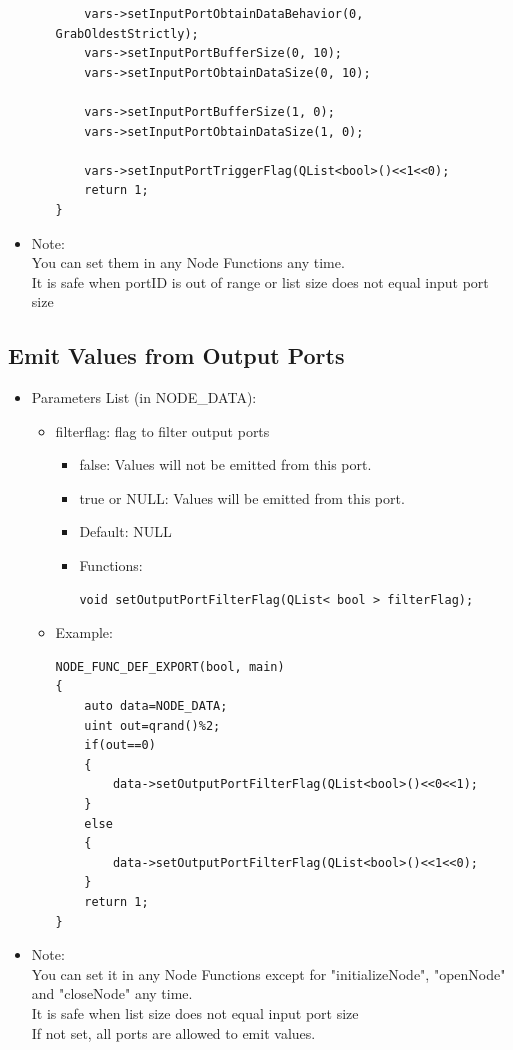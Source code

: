 \documentclass[a4paper,10pt]{book}
\begin{document}
\begin{mdframed}
\begin{itemize}
\begin{itemize}
\begin{verbatim}
    vars->setInputPortObtainDataBehavior(0, GrabOldestStrictly);
    vars->setInputPortBufferSize(0, 10);
    vars->setInputPortObtainDataSize(0, 10);

    vars->setInputPortBufferSize(1, 0);
    vars->setInputPortObtainDataSize(1, 0);
    
    vars->setInputPortTriggerFlag(QList<bool>()<<1<<0);
    return 1;
}
\end{verbatim}
 \end{itemize}
 \item Note: \\ You can set them in any Node Functions any time. \\It is safe when portID is out of range or list size does not equal input port size
\end{itemize}
\end{mdframed}

\subsection{Emit Values from Output Ports}

\begin{mdframed}
\begin{itemize}
 \item Parameters List (in NODE\_DATA):
 \begin{itemize}
  \item filterflag: flag to filter output ports
  \begin{itemize}
   \item false: Values will not be emitted from this port.
   \item true or NULL: Values will be emitted from this port.
   \item Default: NULL
   \item Functions:
   \begin{verbatim}
void setOutputPortFilterFlag(QList< bool > filterFlag);
   \end{verbatim}
  \end{itemize}
  \item Example:
  \begin{verbatim}
NODE_FUNC_DEF_EXPORT(bool, main)
{
    auto data=NODE_DATA;
    uint out=qrand()%2;
    if(out==0)
    {
        data->setOutputPortFilterFlag(QList<bool>()<<0<<1);
    }
    else
    {
        data->setOutputPortFilterFlag(QList<bool>()<<1<<0);
    }
    return 1;
}
\end{verbatim}
 \end{itemize}
 \item Note: \\ You can set it in any Node Functions except for "initializeNode", "openNode" and "closeNode" any time. \\It is safe when list size does not equal input port size \\ If not set, all ports are allowed to emit values.
\end{itemize}
\end{mdframed}
\end{document}
